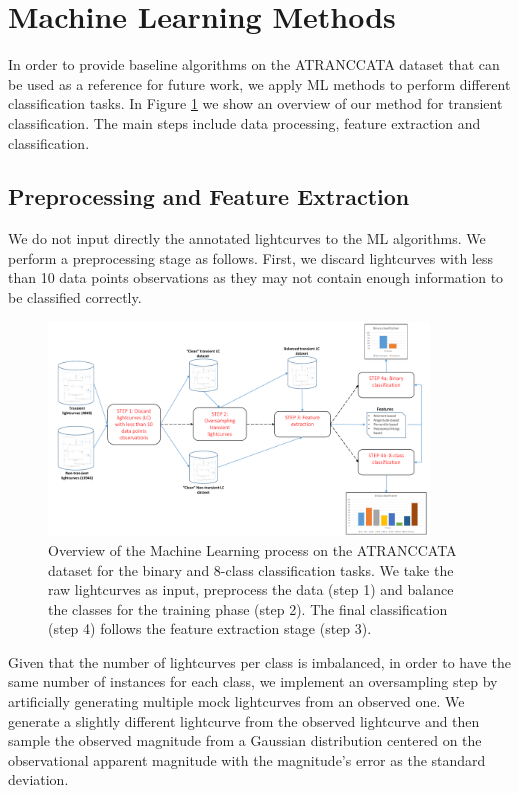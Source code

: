 \documentclass[usenatbib]{mnras}
\begin{document}
\section{Machine Learning Methods} 
\label{sec:ml_tests}
In order to provide baseline algorithms on the ATRANCCATA dataset 
that can be used as a reference for future work, we apply ML methods 
to perform different classification tasks. 
In Figure \ref{fig:ML} we show an overview of our method for transient classification. 
The main steps include data processing, feature extraction and classification.  


\subsection{Preprocessing and Feature Extraction}
We do not input directly the annotated lightcurves to the ML algorithms.
We perform a preprocessing stage as follows. 
First, we discard lightcurves with less than 10 data points observations
as they may not contain enough information to be classified correctly.

\begin{figure}
	\includegraphics[width=0.9\textwidth]{ML.pdf}
  \caption{Overview of the Machine Learning process on the ATRANCCATA dataset for the binary and 8-class classification tasks. We take the raw lightcurves as input, preprocess the data (step 1) and balance the classes for the training phase (step 2). The final classification (step 4) follows the feature extraction stage (step 3).}
  \label{fig:ML}
\end{figure} 


Given that the number of lightcurves per class is imbalanced, 
in order to have the same number of instances for each class, we implement an
oversampling step by artificially generating multiple mock lightcurves 
from an observed one. 
We generate a slightly different lightcurve from the observed lightcurve and 
then sample the observed magnitude from a Gaussian distribution
centered on the observational apparent magnitude with the magnitude's
error as the standard deviation. 
\end{document}
